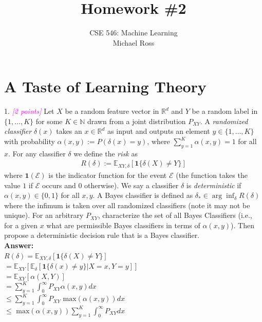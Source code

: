 \documentclass{article}
\date{{}}
\newcommand{\field}[1]{\mathbb{#1}}
\newcommand{\1}{\mathbf{1}}
\newcommand{\E}{\mathbb{E}} %
\newcommand{\R}{\field{R}} %
\newcommand{\grade}[1]{\small\textcolor{magenta}{\emph{[#1 points]}} \normalsize}
\begin{document}
\title{Homework \#2}
\author{\normalsize{CSE 546: Machine Learning}\\
\normalsize{Michael Ross}}
\maketitle

\section{A Taste of Learning Theory}
1. \grade{2}
Let $X$ be a random feature vector in $\R^d$ and $Y$ be a random label in $\{1,\dots,K\}$ for some $K \in \mathbb{N}$ drawn from a joint distribution $P_{XY}$. 
A \emph{randomized classifier} $\delta(x)$ takes an $x\in \R^d$ as input and outputs an element $y \in \{1,\dots,K\}$ with probability $\alpha(x,y) := P(\delta(x) = y)$, where $\sum_{y=1}^K \alpha(x,y) = 1$ for all $x$.
For any classifier $\delta$ we define the \emph{risk} as
\begin{align*}
R(\delta) := \E_{XY,\delta}[ \1\{ \delta(X) \neq Y \}]
\end{align*}
where $\1(\mathcal{E})$ is the indicator function for the event $\mathcal{E}$ (the
function takes the value $1$ if $\mathcal{E}$ occurs and $0$ otherwise).
We say a classifier $\delta$ is \emph{deterministic} if $\alpha(x,y) \in \{0,1\}$ for all $x,y$.
A Bayes classifier is defined as $\delta_* \in \arg\inf_\delta R(\delta)$ where the infimum is taken over all randomized classifiers (note it may not be unique). 
For an arbitrary $P_{XY}$, characterize the set of all Bayes Classifiers (i.e., for a given $x$ what are permissible Bayes classifiers in terms of $\alpha(x,y)$).
Then propose a deterministic decision rule that is a Bayes classifier.\\

\textbf{Answer:}\\
$R(\delta) = \E_{XY,\delta}[ \1\{ \delta(X) \neq Y \}]$\\
$= \E_{XY}[ \E_{\delta}[\1\{ \delta(x) \neq y \} | X=x, Y=y]]$\\
$= \E_{XY}[ \alpha(X,Y)]$\\
$=\sum_{y=1}^K \int_0^\infty P_{XY} \alpha(x,y) dx $\\
$\leq \sum_{y=1}^K \int_0^\infty P_{XY} \text{ max} (\alpha(x,y)) dx $\\
$\leq \text{ max} (\alpha(x,y)) \sum_{y=1}^K \int_0^\infty P_{XY}  dx $\\
\end{document}
